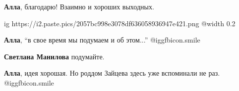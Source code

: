 \begin{itemize}
\begin{itemize}
\begin{itemize}
\textbf{Алла}, благодарю! Взаимно и хороших выходных.


\ifcmt
  ig https://i2.paste.pics/2057bc998e3078df636058936947e421.png
  @width 0.2
\fi

\end{itemize} %

\textbf{Алла}, \enquote{в свое время мы подумаем и об этом...} @igg{fbicon.smile} 

\textbf{Светлана Манилова} подумайте.

\textbf{Алла}, идея хорошая. Но роддом Зайцева здесь уже вспоминали не раз. @igg{fbicon.smile} 

\end{itemize} %

\end{itemize} %

